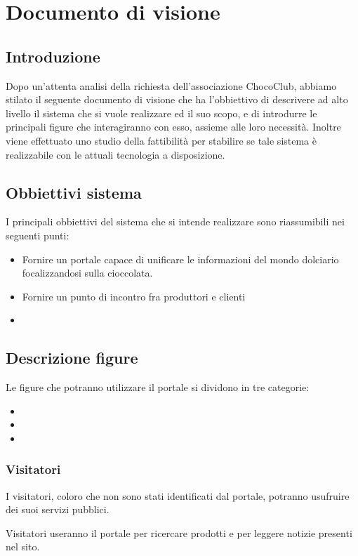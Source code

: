 \chapter{Documento di visione} 
\label{cha:documento_di_visione}

\section{Introduzione}
\label{sec:introduzione}
Dopo un'attenta analisi della richiesta dell'associazione ChocoClub, abbiamo stilato il seguente documento di visione che ha l'obbiettivo di descrivere ad alto livello il sistema che si vuole realizzare ed il suo scopo, e di introdurre le principali figure che interagiranno con esso, assieme alle loro necessità. Inoltre viene effettuato uno studio della fattibilità per stabilire se tale sistema è realizzabile con le attuali tecnologia a disposizione.

\section{Obbiettivi sistema} %
\label{sec:descrizione_sistema}
I principali obbiettivi del sistema che si intende realizzare sono riassumibili nei seguenti punti:
\begin{itemize}
	\item Fornire un portale capace di unificare le informazioni del mondo dolciario focalizzandosi sulla cioccolata.
	\item Fornire un punto di incontro fra produttori e clienti
	\item 
\end{itemize}

\section{Descrizione figure} 
\label{sec:descrizionefigure}
Le figure che potranno utilizzare il portale si dividono in tre categorie:
\begin{itemize}
	\item {}
	\item {}
	\item {}
\end{itemize}

\subsection{Visitatori} %
\label{sub:}
I visitatori, coloro che non sono stati identificati dal portale, potranno usufruire dei suoi servizi pubblici.
\begin{descriptionInd}
    \item[Visitatori] useranno il portale per ricercare prodotti e per leggere notizie presenti nel sito.
\end{descriptionInd}



